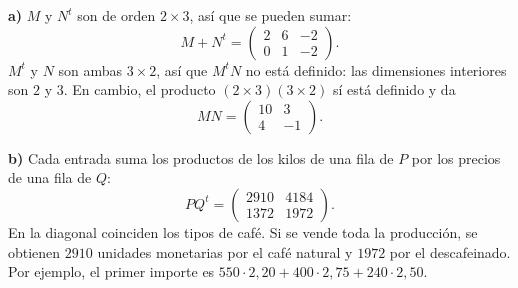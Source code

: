 \textbf{a)} $M$ y $N^t$ son de orden $2\times3$, así que se pueden sumar:
\[
M+N^t=\boxed{\begin{pmatrix}2&6&-2\\0&1&-2\end{pmatrix}}.
\]
$M^t$ y $N$ son ambas $3\times2$, así que $M^tN$ no está definido: las dimensiones interiores son $2$ y $3$. En cambio, el producto $(2\times3)(3\times2)$ sí está definido y da
\[
MN=\boxed{\begin{pmatrix}10&3\\4&-1\end{pmatrix}}.
\]

\textbf{b)} Cada entrada suma los productos de los kilos de una fila de $P$ por los precios de una fila de $Q$:
\[
PQ^t=\boxed{\begin{pmatrix}2910&4184\\1372&1972\end{pmatrix}}.
\]
En la diagonal coinciden los tipos de café. Si se vende toda la producción, se obtienen $2910$ unidades monetarias por el café natural y $1972$ por el descafeinado. Por ejemplo, el primer importe es $550\cdot2{,}20+400\cdot2{,}75+240\cdot2{,}50$.
